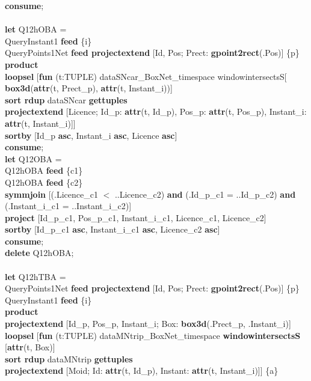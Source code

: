 \documentclass[a4paper]{article}
\newcommand{\op}[1]{\textbf{#1}}
\begin{document}
\begin{scriptsize}
\begin{tabbing}
\op{consume};\\
\\
\op{let} Q12hOBA =\\
\>QueryInstant1 \op{feed} \{i\}\\
\>QueryPoints1Net \op{feed projectextend} [Id, Pos; Prect: \op{gpoint2rect}(.Pos)] \{p\}\\
\>\op{product}\\
\>\op{loopsel} [\op{fun} (t:TUPLE) dataSNcar\_BoxNet\_timespace windowintersectsS[\\
\>\>\>\op{box3d}(\op{attr}(t, Prect\_p), \op{attr}(t, Instant\_i))]\\
\>\>\op{sort rdup} dataSNcar \op{gettuples}\\
\>\>\op{projectextend} [Licence; Id\_p: \op{attr}(t, Id\_p), Pos\_p: \op{attr}(t, Pos\_p), Instant\_i: \op{attr}(t, Instant\_i)]]\\
\>\op{sortby} [Id\_p \op{asc}, Instant\_i \op{asc}, Licence \op{asc}]\\
\op{consume};\\
\op{let} Q12OBA =\\
\>Q12hOBA \op{feed} \{c1\}\\
\>Q12hOBA \op{feed} \{c2\}\\
\>\op{symmjoin} [(.Licence\_c1 $<$ ..Licence\_c2) \op{and} (.Id\_p\_c1 = ..Id\_p\_c2) \op{and} (.Instant\_i\_c1 = ..Instant\_i\_c2)]\\
\>\op{project} [Id\_p\_c1, Pos\_p\_c1, Instant\_i\_c1, Licence\_c1, Licence\_c2]\\
\>\op{sortby} [Id\_p\_c1 \op{asc}, Instant\_i\_c1 \op{asc}, Licence\_c2 \op{asc}]\\
\op{consume};\\
\op{delete} Q12hOBA;\\
\\
\op{let} Q12hTBA =\\
\>QueryPoints1Net \op{feed projectextend} [Id, Pos; Prect: \op{gpoint2rect}(.Pos)] \{p\}\\
\>QueryInstant1 \op{feed} \{i\}\\
\>\op{product}\\
\>\op{projectextend} [Id\_p, Pos\_p, Instant\_i; Box: \op{box3d}(.Prect\_p, .Instant\_i)]\\
\>\op{loopsel} [\op{fun} (t:TUPLE) dataMNtrip\_BoxNet\_timespace \op{windowintersectsS} [\op{attr}(t, Box)]\\
\>\>\op{sort rdup} dataMNtrip \op{gettuples}\\
\>\>\op{projectextend} [Moid; Id: \op{attr}(t, Id\_p), Instant: \op{attr}(t, Instant\_i)]] \{a\}\\

\end{tabbing}
\end{scriptsize}
\end{document}
